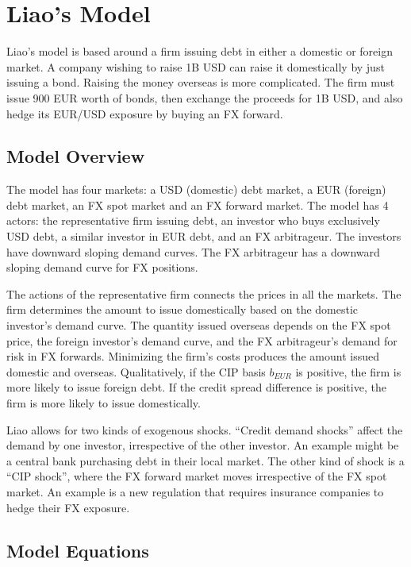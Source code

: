 \section{Liao's Model}  \label{model}

\renewcommand{\theequation}{A\thesection.\arabic{equation}}

Liao's model is based around a firm issuing debt in either a domestic or foreign market.  A company wishing to raise 1B USD can raise it domestically by just issuing a bond.  Raising the money overseas is more complicated.  The firm must issue 900 EUR worth of bonds, then exchange the proceeds for 1B USD, and also hedge its EUR/USD exposure by buying an FX forward.


\subsection{Model Overview}

The model has four markets: a USD (domestic) debt market, a EUR (foreign) debt market, an FX spot market and an FX forward market.  The model has 4 actors: the representative firm issuing debt, an investor who buys exclusively USD debt, a similar investor in EUR debt, and an FX arbitrageur.  The investors have downward sloping demand curves.  The FX arbitrageur has a downward sloping demand curve for FX positions.

The actions of the representative firm connects the prices in all the markets.  The firm determines the amount to issue domestically based on the domestic investor's demand curve.  The quantity issued overseas depends on the FX spot price, the foreign investor's demand curve, and the FX arbitrageur's demand for risk in FX forwards.  Minimizing the firm's costs produces the amount issued domestic and overseas.  Qualitatively, if the CIP basis $b_{EUR}$ is positive, the firm is more likely to issue foreign debt.  If the credit spread difference is positive, the firm is more likely to issue domestically.  

Liao allows for two kinds of exogenous shocks.  ``Credit demand shocks'' affect the demand by one investor, irrespective of the other investor.  An example might be a central bank purchasing debt in their local market.  The other kind of shock is a ``CIP shock'', where the FX forward market moves irrespective of the FX spot market.  An example is a new regulation that requires insurance companies to hedge their FX exposure.

\subsection{Model Equations}

